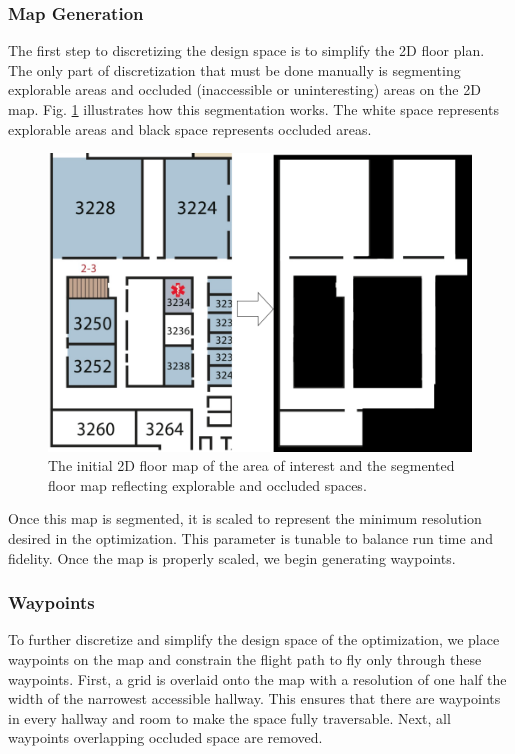 \documentclass[letterpaper, 10 pt, conference]{ieeeconf}  %
\begin{document}
\subsubsection{Map Generation}

The first step to discretizing the design space is to simplify the 2D floor plan. The only part of discretization that must be done manually is segmenting explorable areas and occluded (inaccessible or uninteresting) areas on the 2D map. Fig. \ref{fig:map_gen} illustrates how this segmentation works. The white space represents explorable areas and black space represents occluded areas.

\begin{figure}
\centering
\includegraphics[width=1.0\linewidth]{figures/map_bw.png}
\caption{The initial 2D floor map of the area of interest and the segmented floor map reflecting explorable and occluded spaces.}
\label{fig:map_gen}
\end{figure}

Once this map is segmented, it is scaled to represent the minimum resolution desired in the optimization. This parameter is tunable to balance run time and fidelity. Once the map is properly scaled, we begin generating waypoints.

\subsubsection{Waypoints}

To further discretize and simplify the design space of the optimization, we place waypoints on the map and constrain the flight path to fly only through these waypoints. First, a grid is overlaid onto the map with a resolution of one half the width of the narrowest accessible hallway. This ensures that there are waypoints in every hallway and room to make the space fully traversable. Next, all waypoints overlapping occluded space are removed.
\end{document}
